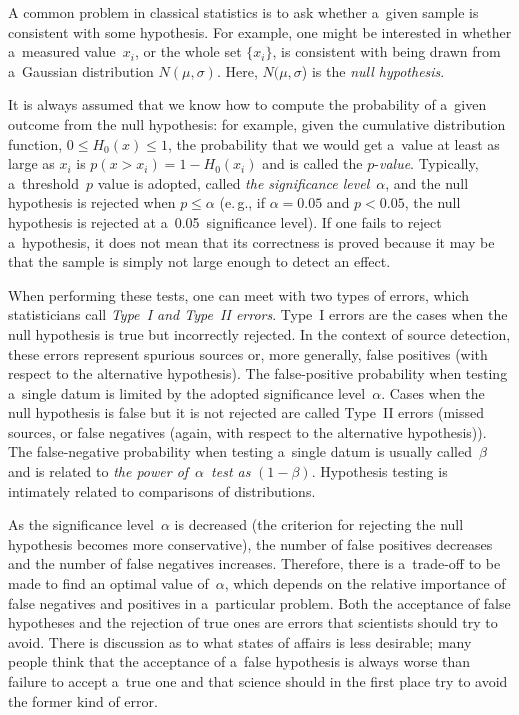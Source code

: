 \begin{multicols}{2}
  A common problem in classical statistics is to ask whether a~given sample is
consistent with some hypothesis. For example, one might be interested in whether a~measured value~$x_i$, or the whole set $\{x_i\}$, is consistent with being drawn
from a~Gaussian distribution $N(\mu ,\sigma)$. Here, $N(\mu,\sigma$) is the
\textit{null hypothesis}.

  It is always assumed that we know how to compute the probability of a~given
outcome from the null hypothesis: for example, given the cumulative distribution
function, $0 \leq H_0(x) \leq 1$, the probability that we would get a~value at least as
large as $x_i$ is $p(x > x_i ) = 1 - H_0(x_i)$ and is called the $p$-\textit{value}.
Typically, a~threshold~$p$ value is adopted, called \textit{the significance
level}~$\alpha$, and the null hypothesis is rejected when $p\leq \alpha$ (e.\,g., if
$\alpha = 0.05$ and $p < 0.05$, the null hypothesis is rejected at a~0.05~significance
level). If one fails to reject a~hypothesis, it does not mean that
its correctness is proved
because it may be that the sample is simply not large enough to detect an effect.

  When performing these tests, one can meet with two types of errors, which
statisticians call \textit{Type~I and Type~II errors}. Type~I errors are
the cases when the
null hypothesis is true but incorrectly rejected. In the context of source detection,
these errors represent spurious sources or, more generally, false positives (with
respect to the alternative hypothesis). The false-positive probability when testing a~single datum is limited by the adopted significance level~$\alpha$. Cases when the
null hypothesis is false but it is not rejected are called Type~II errors (missed
sources, or false negatives (again, with respect to the alternative hypothesis)). The
false-negative probability when testing a~single datum is usually called~$\beta$ and
is related to \textit{the power of}~$\alpha$~\textit{test as} $(1 -\beta)$. Hypothesis
testing is intimately related to comparisons of distributions.

  As the significance level~$\alpha$ is decreased (the criterion for rejecting the null
hypothesis becomes more conservative), the number of false positives decreases and
the number of false negatives increases. Therefore, there is a~trade-off to be made to
find an optimal value of~$\alpha$, which depends on the relative importance of false
negatives and positives in a~particular problem. Both the acceptance of false
hypotheses and the rejection of true ones are errors that scientists should try to avoid.
There is discussion as to what states of affairs is less desirable; many people think
that the acceptance of a~false hypothesis is always worse than failure to accept a~true
one and that science should in the first place try to avoid the former kind of error.


\end{multicols}
